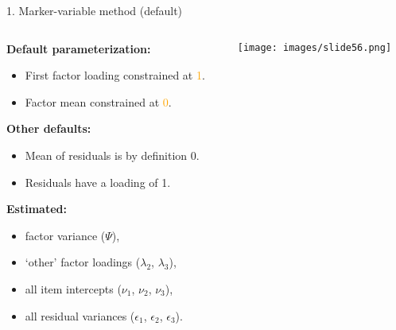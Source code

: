 \documentclass[10pt]{beamer}\usepackage[]{graphicx}\usepackage[]{xcolor}
\begin{document}
\begin{frame}{1. Marker-variable method (default)}

    \begin{columns}[T] %
    \begin{column}{.65\textwidth}

        \textbf{Default parameterization:}
        \begin{itemize}
            \item First factor loading constrained at \textcolor{orange}{1}.
            \item Factor mean constrained at \textcolor{orange}{0}.
        \end{itemize} 
        \textbf{Other defaults:}
        \begin{itemize}
            \item Mean of residuals is by definition 0.
            \item Residuals have a loading of 1.
        \end{itemize} 
        \textbf{Estimated:}
        \begin{itemize}
            \item factor variance ($\Psi$), 
            \item `other' factor loadings ($\lambda_2$, $\lambda_3$),
            \item all item intercepts ($\nu_1$, $\nu_2$, $\nu_3$), 
            \item all residual variances ($\epsilon_1$, $\epsilon_2$, $\epsilon_3$).
        \end{itemize}

    \end{column}%
    
    \hfill%
    \begin{column}{.34\textwidth}

            \texttt{[image: images/slide56.png]}     
     
    \end{column}%

    \end{columns}

\end{frame}
%
\end{document}
